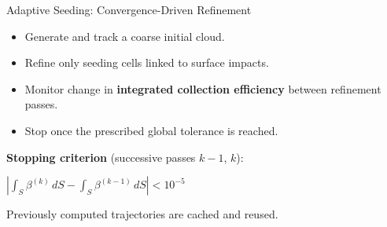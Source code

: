 \begin{frame}{Adaptive Seeding: Convergence-Driven Refinement}
\par
\vspace{0.15cm}
\begin{itemize}\setlength\itemsep{0.12cm}
  \item Generate and track a coarse initial cloud.
  \item Refine only seeding cells linked to surface impacts.
  \item Monitor change in \textbf{integrated collection efficiency} between refinement passes.
  \item Stop once the prescribed global tolerance is reached.
\end{itemize}
\vspace{0.25cm}
\textbf{Stopping criterion} (successive passes $k-1$, $k$):\par
\vspace{0.25cm}
{\centering
  $\displaystyle\left|\int_S \beta^{(k)}\,dS-\int_S \beta^{(k-1)}\,dS\right| < 10^{-5}$\par}
\vspace{0.3cm}
{\color{champsBlue}Previously computed trajectories are cached and reused.}
\end{frame}

